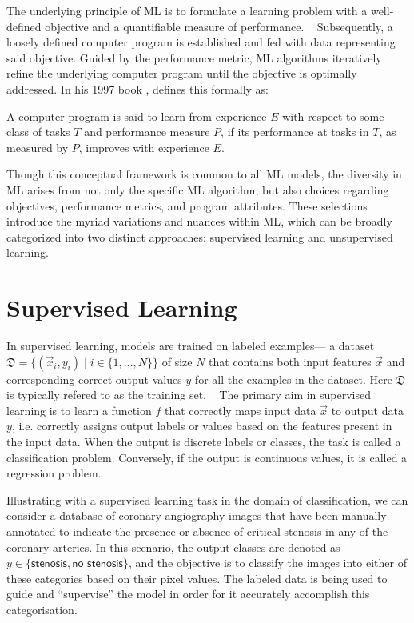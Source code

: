 The underlying principle of \ac{ML} is to formulate a learning problem with a
well-defined objective and a quantifiable measure of performance.
~\autocite{murphyMachine2012}
Subsequently,
a loosely defined computer program is established and fed with data
representing said objective.
Guided by the performance metric, \ac{ML}
algorithms iteratively refine the underlying computer program until the
objective is optimally addressed. 
In his 1997 book ,
\citeauthor*{mitchellMachine1997} defines this formally as:
\begin{displayquote}[mitchellMachine1997]
   A computer program is said to learn from experience \(E\)
   with respect to some class of tasks \(T\) and performance measure \(P\),
   if its performance at tasks in \(T\), as measured by \(P\), 
   improves with experience \(E\).
\end{displayquote}
Though this conceptual framework is common to all \ac{ML} models, 
the diversity in \ac{ML} arises from not only the specific \ac{ML} algorithm, 
but also choices regarding objectives, performance metrics, and program attributes. 
These selections introduce the myriad variations and nuances within \ac{ML}, 
which can be broadly categorized into two distinct approaches:
supervised learning
and 
unsupervised learning.
~\autocite{murphyMachine2012}

\section{Supervised Learning}

In supervised learning, models are trained on labeled examples---%
a dataset 
\(\mathfrak{D} = \{(\vec{x}_i, y_i) \mid i \in \{1, \ldots, N\}\} \) 
of size \(N\) that contains both input features \(\vec{x}\)
and corresponding correct output values \(y\)
for all the examples in the dataset. 
Here \( \mathfrak{D} \) is typically refered to as the training set.
~\autocite{murphyMachine2012}
The primary aim in supervised learning 
is to learn a function \(f\) that correctly 
maps input data \(\vec{x}\) to output data \(y\), 
i.e. correctly assigns output labels or values
based on the features present in the input data.
When the output is discrete labels or classes, 
the task is called a classification problem.
Conversely, 
if the output is continuous values,
it is called a regression problem.

Illustrating with a supervised learning task in the domain of classification, 
we can consider a database of coronary angiography images that have been 
manually annotated to indicate the presence or absence of critical stenosis 
in any of the coronary arteries. 
In this scenario, 
the output classes are denoted as 
\(y \in \{\textsf{stenosis}, \textsf{no stenosis}\}\), 
and the objective is to classify the images 
into either of these categories based on their pixel values.
The labeled data is being used to guide and \enquote{supervise}
the model in order for it accurately accomplish this categorisation.

